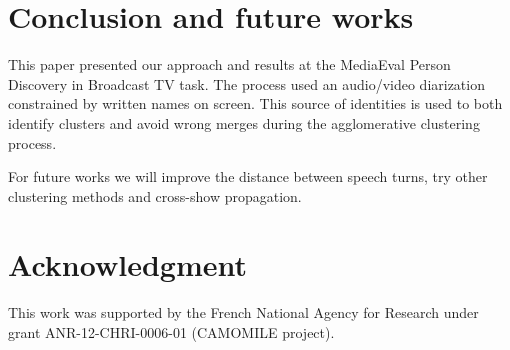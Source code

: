 \documentclass{acm_proc_article-me}
\begin{document}
%
%
%
%
%



\section{Conclusion and future works}

This paper presented our approach and results at the MediaEval Person Discovery in Broadcast TV task. The process used an audio/video diarization constrained by written names on screen.
This source of identities is used to both identify clusters and avoid wrong merges during the agglomerative clustering process.

For future works we will improve the distance between speech turns, try other clustering methods and cross-show propagation.


\section{Acknowledgment}

This work was supported by the French National Agency for Research under grant ANR-12-CHRI-0006-01 (CAMOMILE project).


\end{document}
